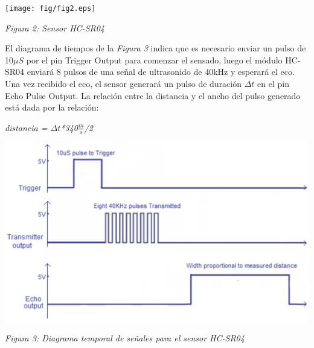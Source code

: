 \documentclass[a4paper,11pt]{article}
\begin{document}
	\begin{center}
		\texttt{[image: fig/fig2.eps]}
		\begin{center}		
			\textit{Figura 2: Sensor HC-SR04}
		\end{center}	
	\end{center}


El diagrama de tiempos de la \textit{Figura 3} indica que es necesario enviar un pulso de 10$\mu S$ por el pin Trigger Output para comenzar el sensado, luego el módulo HC-SR04 enviará 8 pulsos de una señal de ultrasonido de 40kHz y esperará el eco. Una vez recibido el eco, el sensor generará un pulso de duración $\Delta t$ en el pin Echo Pulse Output. La relación entre la distancia y el ancho del pulso generado está dada por la relación: 
	
	\begin{center}
		\textit{distancia = $\Delta t$*340$\frac{m}{s}$/2}
	\end{center}

	\begin{center}
		\includegraphics[width=1\textwidth]{fig/fig3.eps}
		\begin{center}	
			\textit{Figura 3: Diagrama temporal de señales para el sensor HC-SR04}
		\end{center}	
	\end{center}
\end{document}
